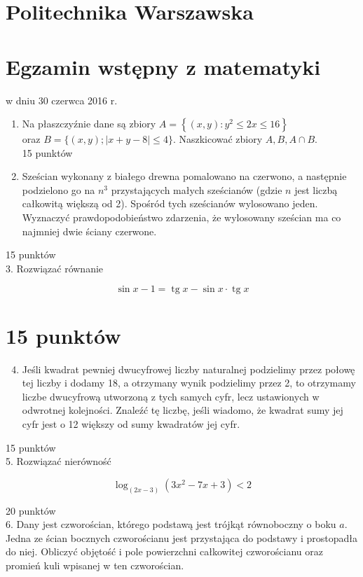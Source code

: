 \documentclass[10pt]{article}
\begin{document}
\section*{Politechnika Warszawska}
\section*{Egzamin wstępny z matematyki}
w dniu 30 czerwca 2016 r.

\begin{enumerate}
  \item Na płaszczyźnie dane są zbiory \(A=\left\{(x, y): y^{2} \leq 2 x \leq 16\right\}\)\\
oraz \(B=\{(x, y) ;|x+y-8| \leq 4\}\). Naszkicować zbiory \(A, B, A \cap B\).\\
15 punktów
  \item Sześcian wykonany z białego drewna pomalowano na czerwono, a następnie podzielono go na \(n^{3}\) przystających małych sześcianów (gdzie \(n\) jest liczbą całkowitą większą od 2). Spośród tych sześcianów wylosowano jeden. Wyznaczyć prawdopodobieństwo zdarzenia, że wylosowany sześcian ma co najmniej dwie ściany czerwone.
\end{enumerate}

15 punktów\\
3. Rozwiązać równanie

\[
\sin x-1=\operatorname{tg} x-\sin x \cdot \operatorname{tg} x
\]

\section*{15 punktów}
\begin{enumerate}
  \setcounter{enumi}{3}
  \item Jeśli kwadrat pewniej dwucyfrowej liczby naturalnej podzielimy przez połowę tej liczby i dodamy 18, a otrzymany wynik podzielimy przez 2, to otrzymamy liczbe dwucyfrową utworzoną z tych samych cyfr, lecz ustawionych w odwrotnej kolejności. Znaleźć tę liczbę, jeśli wiadomo, że kwadrat sumy jej cyfr jest o 12 większy od sumy kwadratów jej cyfr.
\end{enumerate}

15 punktów\\
5. Rozwiązać nierówność

\[
\log _{(2 x-3)}\left(3 x^{2}-7 x+3\right)<2
\]

20 punktów\\
6. Dany jest czworościan, którego podstawą jest trójkąt równoboczny o boku \(a\). Jedna ze ścian bocznych czworościanu jest przystająca do podstawy i prostopadła do niej. Obliczyć objętość i pole powierzchni całkowitej czworościanu oraz promień kuli wpisanej w ten czworościan.
\end{document}
